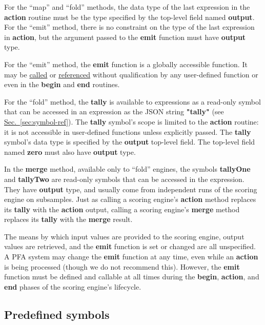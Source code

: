 \documentclass{article}
\newcommand{\PFAc}{\ttfamily\bfseries}
\theoremstyle{definition}
\begin{document}
For the ``map'' and ``fold'' methods, the data type of the last expression in the {\PFAc action} routine must be the type specified by the top-level field named {\PFAc output}.  For the ``emit'' method, there is no constraint on the type of the last expression in {\PFAc action}, but the argument passed to the {\PFAc emit} function must have {\PFAc output} type.

For the ``emit'' method, the {\PFAc emit} function is a globally accessible function.  It may be \hyperlink{hsec:function-call}{called} or \hyperlink{hsec:fcnref}{referenced} without qualification by any user-defined function or even in the {\PFAc begin} and {\PFAc end} routines.

For the ``fold'' method, the {\PFAc tally} is available to expressions as a read-only symbol that can be accessed in an expression as the JSON string {\PFAc "tally"} (see \hyperlink{hsec:symbol-ref}{Sec.~\ref{sec:symbol-ref}}).  The {\PFAc tally} symbol's scope is limited to the {\PFAc action} routine: it is not accessible in user-defined functions unless explicitly passed.  The {\PFAc tally} symbol's data type is specified by the {\PFAc output} top-level field.  The top-level field named {\PFAc zero} must also have {\PFAc output} type.

In the {\PFAc merge} method, available only to ``fold'' engines, the symbols {\PFAc tallyOne} and {\PFAc tallyTwo} are read-only symbols that can be accessed in the expression.  They have {\PFAc output} type, and usually come from independent runs of the scoring engine on subsamples.  Just as calling a scoring engine's {\PFAc action} method replaces its {\PFAc tally} with the {\PFAc action} output, calling a scoring engine's {\PFAc merge} method replaces its {\PFAc tally} with the {\PFAc merge} result.

The means by which input values are provided to the scoring engine, output values are retrieved, and the {\PFAc emit} function is set or changed are all unspecified.  A PFA system may change the {\PFAc emit} function at any time, even while an {\PFAc action} is being processed (though we do not recommend this).  However, the {\PFAc emit} function must be defined and callable at all times during the {\PFAc begin}, {\PFAc action}, and {\PFAc end} phases of the scoring engine's lifecycle.

\hypertarget{hsec:predefs}{}
\subsection{Predefined symbols}
\label{sec:predefs}
\end{document}
